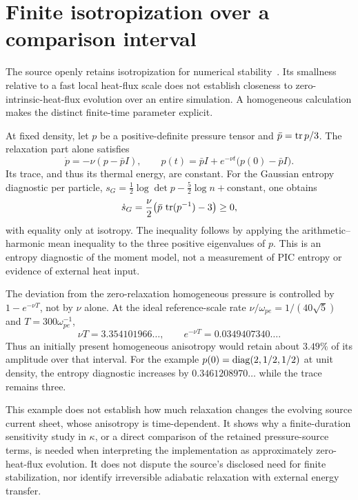 \section{Finite isotropization over a comparison interval}
\label{sec:entropy}
The source openly retains isotropization for numerical stability~\cite{original}.
Its smallness relative to a fast local heat-flux scale does not establish
closeness to zero-intrinsic-heat-flux evolution over an entire simulation.
A homogeneous calculation makes the distinct finite-time parameter explicit.

At fixed density, let $p$ be a positive-definite pressure tensor and
$\bar p=\operatorname{tr} p/3$. The relaxation part alone satisfies
\begin{equation}
 \dot p=-\nu(p-\bar p I),\qquad
 p(t)=\bar p I+e^{-\nu t}\bigl(p(0)-\bar p I\bigr).
 \label{eq:homogeneous-isotropization}
\end{equation}
Its trace, and thus its thermal energy, are constant. For the Gaussian
entropy diagnostic per particle,
$s_G=\tfrac12\log\det p-\tfrac52\log n+\text{constant}$, one obtains
\begin{equation}
 \dot s_G=\frac{\nu}{2}
 \bigl(\bar p\,\operatorname{tr}(p^{-1})-3\bigr)\ge0,
 \label{eq:entropy-production}
\end{equation}
with equality only at isotropy. The inequality follows by applying the
arithmetic--harmonic mean inequality to the three positive eigenvalues of $p$.
This is an entropy diagnostic of the moment model, not a measurement of
PIC entropy or evidence of external heat input.

The deviation from the zero-relaxation homogeneous pressure is controlled by
$1-e^{-\nu T}$, not by $\nu$ alone. At the ideal reference-scale rate
$\nu/\omega_{pe}=1/(40\sqrt5)$ and $T=300\omega_{pe}^{-1}$,
\begin{equation}
 \nu T=3.354101966\ldots,\qquad
 e^{-\nu T}=0.0349407340\ldots.
 \label{eq:finite-relaxation-duration}
\end{equation}
Thus an initially present homogeneous anisotropy would retain about $3.49\%$
of its amplitude over that interval. For the example
$p(0)=\operatorname{diag}(2,1/2,1/2)$ at unit density, the entropy diagnostic increases
by $0.3461208970\ldots$ while the trace remains three.

This example does not establish how much relaxation changes the evolving
source current sheet, whose anisotropy is time-dependent. It shows why a
finite-duration sensitivity study in $\kappa$, or a direct comparison of the
retained pressure-source terms, is needed when interpreting the implementation
as approximately zero-heat-flux evolution. It does not dispute the source's
disclosed need for finite stabilization, nor identify irreversible adiabatic
relaxation with external energy transfer.
